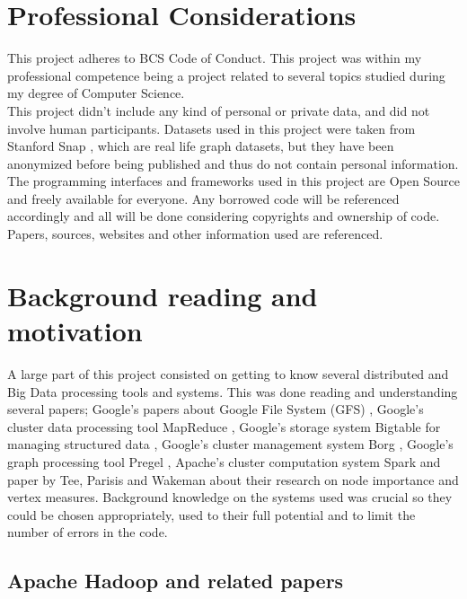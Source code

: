 \documentclass{article}
\theoremstyle{definition}
\begin{document}
\section{Professional Considerations}
This project adheres to BCS Code of Conduct. This project was within my professional competence being a project related to several topics studied during my degree of Computer Science. \\

This project didn't include any kind of personal or private data, and did not involve human participants. Datasets used in this project were taken from Stanford Snap \cite{snap}, which are real life graph datasets, but they have been anonymized before being published and thus do not contain personal information. \\

The programming interfaces and frameworks used in this project are Open Source and freely available for everyone. Any borrowed code will be referenced accordingly and all will be done considering copyrights and ownership of code. Papers, sources, websites and other information used are referenced. \\

\section{Background reading and motivation}
A large part of this project consisted on getting to know several distributed and Big Data processing tools and systems. This was done reading and understanding several papers; Google's papers about Google File System (GFS) \cite{Ghemawat2003}, Google's cluster data processing tool MapReduce \cite{Dean}, Google's storage system Bigtable for managing structured data \cite{Chang}, Google's cluster management system Borg \cite{Verma}, Google's graph processing tool Pregel \cite{Malewicz2010}, Apache's cluster computation system Spark \cite{Zaharia2012} and paper by Tee, Parisis and Wakeman \cite{Tee2016b} about their research on node importance and vertex measures. Background knowledge on the systems used was crucial so they could be chosen appropriately, used to their full potential and to limit the number of errors in the code. 

\subsection{Apache Hadoop and related papers}
\end{document}
